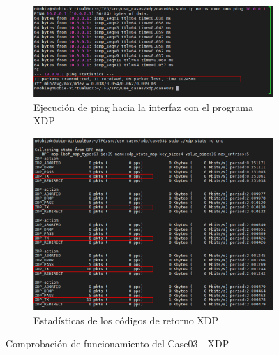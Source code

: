 \begin{figure}[ht]
    \centering
    \begin{subfigure}[b]{\textwidth}
    	\centering
        \includegraphics[width=12cm]{archivos/img/dev/xdp/case03/demo_case03_2_edited.png}
        \caption{Ejecución de ping hacia la interfaz con el programa XDP}
        \label{fig:case03_xdp_ether_func_ping}
    \end{subfigure}
    \par\bigskip
    \begin{subfigure}[b]{\textwidth}
    	\centering
        \includegraphics[width=11cm]{archivos/img/dev/xdp/case03/demo_case03_3_edited.png}
        \caption{Estadísticas de los códigos de retorno XDP}
        \label{fig:case03_xdp_ether_func_stats}
    \end{subfigure}
    \caption{Comprobación de funcionamiento del Case03 - XDP}
    \label{fig:case03_xdp_ether_func1}
\end{figure}

